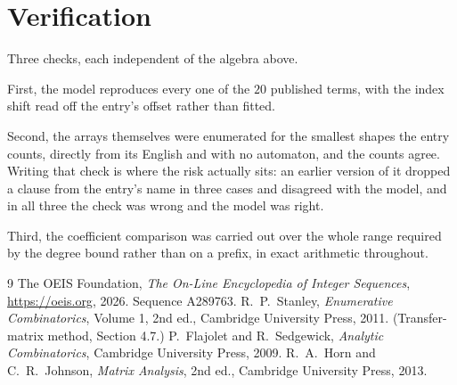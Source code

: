 \documentclass[11pt,a4paper]{article}
\theoremstyle{plain}
\theoremstyle{definition}
\begin{document}
\section{Verification}

Three checks, each independent of the algebra above.

First, the model reproduces every one of the $20$ published terms, with the index shift
read off the entry's offset rather than fitted.

Second, the arrays themselves were enumerated for the smallest shapes the entry counts,
directly from its English and with no automaton, and the counts agree. Writing that check is
where the risk actually sits: an earlier version of it dropped a clause from the entry's name
in three cases and disagreed with the model, and in all three the check was wrong and the model
was right.

Third, the coefficient comparison was carried out over the whole range required by the degree
bound rather than on a prefix, in exact arithmetic throughout.

\begin{thebibliography}{9}
 The OEIS Foundation, \emph{The On-Line Encyclopedia of Integer
Sequences}, \url{https://oeis.org}, 2026. Sequence A289763.
 R.~P.~Stanley, \emph{Enumerative Combinatorics}, Volume 1, 2nd ed.,
Cambridge University Press, 2011. (Transfer-matrix method, Section 4.7.)
 P.~Flajolet and R.~Sedgewick, \emph{Analytic Combinatorics}, Cambridge
University Press, 2009.
 R.~A.~Horn and C.~R.~Johnson, \emph{Matrix Analysis}, 2nd ed., Cambridge
University Press, 2013.
\end{thebibliography}
\end{document}
